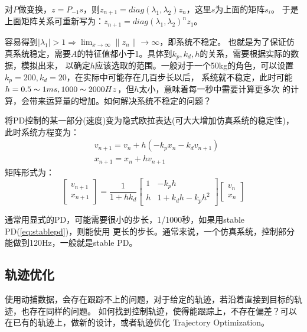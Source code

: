 \documentclass[lang=cn,newtx,10pt,scheme=chinese]{elegantbook}
\begin{document}
对$P$做变换，$z=P_{-1}s$，则$z_{n+1}=diag(\lambda_1, \lambda_2)z_n$，这里$s$为上面的矩阵$s_i$。
于是上面矩阵关系可重新写为：$z_{n+1}=diag(\lambda_1, \lambda_2)^n z_1$。

容易得到$|\lambda_1|>1 \Rightarrow \lim_{x \to \infty}\|z_n\| \rightarrow \infty$，即系统不稳定。
也就是为了保证仿真系统稳定，需要$A$的特征值都小于1。具体到$k_p,k_d,h$的关系，需要根据实际的数据，模拟出来，
以确定$h$应该选取的范围。一般对于一个50kg的角色，可以设置$k_p = 200, k_d = 20$，在实际中可能存在几百步长以后，
系统就不稳定，此时可能$h=0.5\thicksim 1ms, 1000\thicksim 2000Hz$，但$h$太小，意味着每一秒中需要计算更多次
的计算，会带来运算量的增加。如何解决系统不稳定的问题？

将PD控制的某一部分(速度)变为隐式欧拉表达(可大大增加仿真系统的稳定性)，
此时系统方程变为：
\begin{equation}
  \label{eq:stablepd}
  \begin{aligned}
  & v_{n+1}=v_n+h (-k_{p}x_n - k_{d}v_{n+1}) \\
  & x_{n+1}=x_n+h v_{n+1}
  \end{aligned}
\end{equation}
矩阵形式为：
\begin{equation}
  \left[\begin{array}{l}
  v_{n+1} \\
  x_{n+1}
  \end{array}\right]=\frac{1}{1+h k_d}\left[\begin{array}{cc}
  1 & -k_p h \\
  h & 1+k_d h-k_p h^2
  \end{array}\right]\left[\begin{array}{l}
  v_n \\
  x_n
  \end{array}\right]
\end{equation}

通常用显式的PD，可能需要很小的步长，1/1000秒，如果用stable PD(\ref{eq:stablepd})，则能使用
更长的步长。通常来说，一个仿真系统，控制部分能做到120Hz，一般就是stable PD。

\subsection{轨迹优化}
使用动捕数据，会存在跟踪不上的问题，对于给定的轨迹，若沿着直接到目标的轨迹，也存在同样的问题。
如何找到控制轨迹，使得能跟踪上，不存在偏差？可以在已有的轨迹上，做新的设计，或者轨迹优化
Trajectory Optimization。
\end{document}
